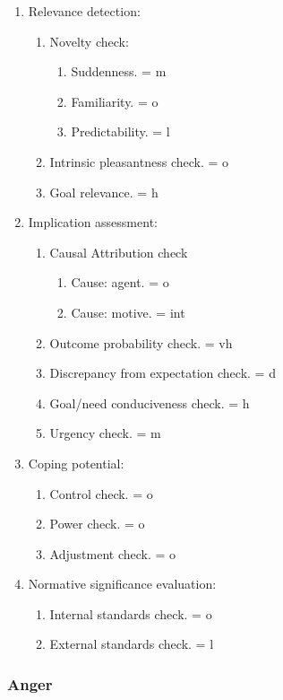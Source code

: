 \begin{enumerate}
 \item  Relevance detection:
 \begin{enumerate}
  \item  Novelty check:
  \begin{enumerate}
   \item  Suddenness. = m
   \item  Familiarity. = o
   \item  Predictability. = l
  \end{enumerate}
  \item  Intrinsic pleasantness check. = o
  \item  Goal relevance. = h
 \end{enumerate}
 \item  Implication assessment:
 \begin{enumerate}
  \item  Causal Attribution check
  \begin{enumerate}
   \item  Cause: agent. = o
   \item  Cause: motive. = int
  \end{enumerate}
  \item  Outcome probability check. = vh
  \item  Discrepancy from expectation check. = d
  \item  Goal/need conduciveness check. = h
  \item  Urgency check. = m
 \end{enumerate}
 \item  Coping potential:
 \begin{enumerate}
  \item  Control check. = o
  \item  Power check. = o
  \item  Adjustment check. = o
 \end{enumerate}
 \item  Normative significance evaluation:
 \begin{enumerate}
  \item  Internal standards check. = o
  \item  External standards check. = l
 \end{enumerate}
\end{enumerate}

\subsubsection{Anger}


